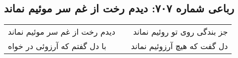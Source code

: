 \begin{center}
\section*{رباعی شماره ۷۰۷: دیدم رخت از غم سر موئیم نماند}
\label{sec:0707}
\begin{longtable}{l p{0.5cm} r}
دیدم رخت از غم سر موئیم نماند
&&
جز بندگی روی تو روئیم نماند
\\
با دل گفتم که آرزوئی در خواه
&&
دل گفت که هیچ آرزوئیم نماند
\\
\end{longtable}
\end{center}
